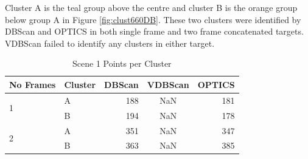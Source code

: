 Cluster A is the teal group above the centre and cluster B is the orange group below group A in Figure \ref{fig:clust660DB}. These two clusters were identified by \ac{DBScan} and \ac{OPTICS} in both single frame and two frame concatenated targets. \ac{VDBScan} failed to identify any clusters in either target.

\begin{table}[H]
\centering
\begin{tabular}{|l|l|r|c|r|}
\hline
\textbf{No Frames} & \textbf{Cluster} & \multicolumn{1}{l|}{\textbf{DBScan}} & \multicolumn{1}{l|}{\textbf{VDBScan}} & \multicolumn{1}{l|}{\textbf{OPTICS}} \\ \hline
\multirow{2}{*}{1} & A                & 188                                  & NaN                                   & 181                                  \\ \cline{2-5} 
                   & B                & 194                                  & NaN                                   & 178                                  \\ \hline
\multirow{2}{*}{2} & A                & 351                                  & NaN                                   & 347                                  \\ \cline{2-5} 
                   & B                & 363                                  & NaN                                   & 385                                  \\ \hline
\end{tabular}
\caption{Scene 1 Points per Cluster}
\label{tab:660Clust}
\end{table}



